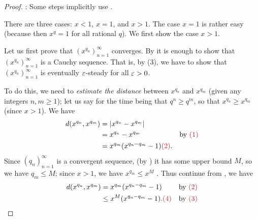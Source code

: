 \begin{proof}
: Some steps implicitly use .

There are three cases: \(x < 1\), \(x = 1\), and \(x > 1\).
The case \(x = 1\) is rather easy (because then \(x^q = 1\) for all rational \(q\)).
We first show the case \(x > 1\).

Let us first prove that \((x^{q_n})_{n = 1}^{\infty}\) converges.
By  it is enough to show that \((x^{q_n})_{n = 1}^{\infty}\) is a Cauchy sequence.
That is, by (3), we have to show that \((x^{q_n})_{n = 1}^{\infty}\) is eventually \(\varepsilon\)-steady for all \(\varepsilon > 0\).

To do this, we need to \emph{estimate the distance} between \(x^{q_n}\) and \(x^{q_m}\) (given any integers \(n, m \ge 1\));
let us say for the time being that \(q^n \ge q^m\), so that \(x^{q_n} \ge x^{q_m}\)  (since \(x > 1\)).
We have
\begin{align*}
    d(x^{q_n}, x^{q_m}) & = \abs{x^{q_n} - x^{q_m}} \\
                        & = x^{q_n} - x^{q_m} & \text{by \MAROON{(1)}} \\
                        & = x^{q_m}(x^{q_n - q_m} - 1) \MAROON{(2)}.
\end{align*}
Since \((q_n)_{n = 1}^{\infty}\) is a convergent sequence, (by ) it has some upper bound \(M\), so we have \(q_m \le M\);
since \(x > 1\), we have \(x^{q_m} \le x^M\) .
Thus continue from , we have
\begin{align*}
    d(x^{q_n}, x^{q_m}) & = x^{q_m}(x^{q_n - q_m} - 1) & \text{by \MAROON{(2)}} \\
                        & \le x^M(x^{q_n - q_m} - 1). \MAROON{(4)} & \text{by \MAROON{(3)}}
\end{align*}


\end{proof}
